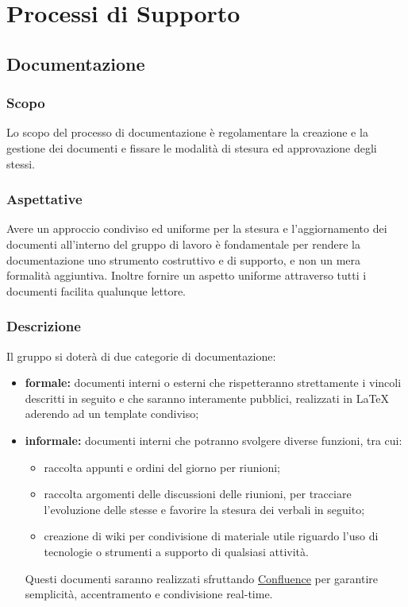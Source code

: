 \section{Processi di Supporto}
\label{supporto}
\subsection{Documentazione}
    \subsubsection{Scopo}
        Lo scopo del processo di documentazione è regolamentare la creazione e la gestione dei documenti e fissare le modalità di stesura ed approvazione degli stessi.
    \subsubsection{Aspettative}
        Avere un approccio condiviso ed uniforme per la stesura e l'aggiornamento dei documenti all'interno del gruppo di lavoro è fondamentale per rendere la documentazione uno strumento costruttivo e di supporto, e non un mera formalità aggiuntiva.
        Inoltre fornire un aspetto uniforme attraverso tutti i documenti facilita qualunque lettore.
    \subsubsection{Descrizione}
        Il gruppo \group si doterà di due categorie di documentazione:
        \begin{itemize}
            \item \textbf{formale: }documenti interni o esterni che rispetteranno strettamente i vincoli descritti in seguito e che saranno interamente pubblici, realizzati in \LaTeX{} aderendo ad un template condiviso;
            \item \textbf{informale: }documenti interni che potranno svolgere diverse funzioni, tra cui:
            \begin{itemize}
                \item  raccolta appunti e ordini del giorno per riunioni;
                \item  raccolta argomenti delle discussioni delle riunioni, per tracciare l'evoluzione delle stesse e favorire la stesura dei verbali in seguito;
                \item  creazione di wiki per condivisione di materiale utile riguardo l'uso di tecnologie o strumenti a supporto di qualsiasi attività.
            \end{itemize}
            Questi documenti saranno realizzati sfruttando \href{https://www.atlassian.com/software/confluence}{Confluence} per garantire semplicità, accentramento e condivisione real-time.

        \end{itemize}
